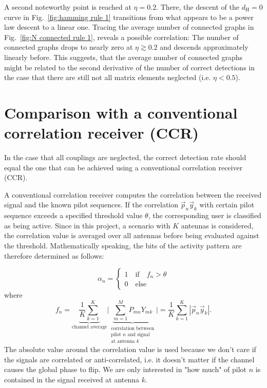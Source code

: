 \documentclass{article}
\begin{document}
	
	A second noteworthy point is reached at $\eta=0.2$. There, the descent of the $d_\text{H}=0$ curve in Fig.~\ref{fig:hamming rule 1} transitions from what appears to be a power law descent to a linear one. Tracing the average number of connected graphs in Fig.~\ref{fig:N connected rule 1}, reveals a possible correlation: The number of connected graphs drops to nearly zero at $\eta\gtrsim0.2$ and descends approximately linearly before. This suggests, that the average number of connected graphs might be related to the second derivative of the number of correct detections in the case that there are still not all matrix elements neglected (i.e. $\eta<0.5$).
	
	
	
	\section{Comparison with a conventional correlation receiver (CCR)}\label{sec:comparison with CCR}
	In the case that all couplings are neglected, the correct detection rate should equal the one that can be achieved using a conventional correlation receiver (CCR). 
	
	A conventional correlation receiver computes the correlation between the received signal and the known pilot sequences. If the correlation $\vec p_n \vec y_k$ with certain pilot sequence exceeds a specified threshold value $\theta$, the corresponding user is classified as being active. Since in this project, a scenario with $K$ antennas is considered, the correlation value is averaged over all antennas before being evaluated against the threshold. Mathematically speaking, the bits of the activity pattern are therefore determined as follows:
	
	\begin{equation}
		\alpha_n = \begin{cases}
				1 \quad\text{if}\quad f_n>\theta\\ 0 \quad\text{else}
		\end{cases}
	\end{equation}
	where
	\begin{equation}
		f_n = \underbrace{\frac{1}{K}\sum\limits_{k=1}^{K}}_\text{channel average}\biggl|\underbrace{\sum\limits_{m=1}^{M}P_{mn}Y_{mk}}_{\substack{\text{correlation between}\\\text{pilot $n$ and signal}\\\text{at antenna $k$}}}\biggr| = \frac{1}{K}\sum\limits_{k=1}^{K}|\vec p_n \vec y_k|.
	\end{equation}
	The absolute value around the correlation value is used because we don't care if the signals are correlated or anti-correlated, i.e. it doesn't matter if the channel causes the global phase to flip. We are only interested in "how much" of pilot $n$ is contained in the signal received at antenna $k$.
	
\end{document}
